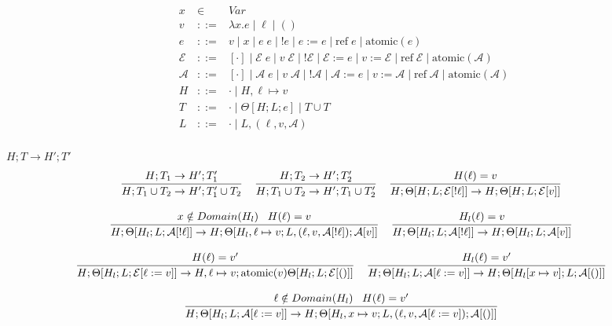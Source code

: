 \documentclass[9pt]{article}
\newcommand{\aeval}[1]{\mathcal{A}[#1]}
\newcommand{\actxt}[0]{\mathcal{A}}
\newcommand{\eval}[1]{\mathcal{E}[#1]}
\newcommand{\ctxt}[0]{\mathcal{E}}
\newcommand{\loc}[0]{\ell}
\newcommand{\atomic}[1]{\text{atomic}(#1)}
\newcommand{\alloc}[1]{\text{ref} \; #1}
\begin{document}
\begin{displaymath}
\begin{array}{rcll}
x &\in& Var \\
v &::=& \lambda x. e \; | \; \loc \; | \; () \\
e &::=& v \; | \; x \; | \; e \; e \; | \; !e \; | \; e := e \; | \; \alloc{e} \; | \; \atomic{e}\\
\ctxt &::=& [\cdot] \; | \; \ctxt \; e \; | \; v \; \ctxt \; | \; ! \ctxt \; | \; \ctxt := e \; | \; v := \ctxt \; | \; \alloc{\ctxt} \; | \; \atomic{\actxt}\\
\actxt &::=& [\cdot] \; | \; \actxt \; e \; | \; v \; \actxt \; | \; ! \actxt \; | \; \actxt := e \; | \; v := \actxt \; | \; \alloc{\actxt} \; | \; \atomic{\actxt} \\
H &::=& \cdot \; | \; H, \loc \mapsto v \\
T &::=& \cdot \; | \; \Theta[H; L; e] \; | \; T \cup T \\
L &::=& \cdot \; | \; L, (\loc, v, \actxt) \\
\end{array}
\end{displaymath}


$\boxed{H; T \rightarrow H' ;T'}$
\[
\infer[]{H; T_1 \cup T_2 \rightarrow H'; T_1' \cup T_2}{H; T_1 \rightarrow H'; T_1'} \;\;\;
\infer[]{H; T_1 \cup T_2 \rightarrow H'; T_1 \cup T_2'}{H; T_2 \rightarrow H'; T_2'} \;\;\; 
\infer[]{H; \Theta[H; L; \eval{!\loc}] \rightarrow H; \Theta[H; L; \eval{v}]}{H(\loc) = v}
\]

\[
\infer[]{H; \Theta[H_l; L; \aeval{!\loc}] \rightarrow H; \Theta[H_l, \loc \mapsto v; L, (\loc, v, \aeval{!\loc}); \aeval{v}]}{x \notin Domain(H_l) \;\;\; H(\loc) = v } \;\;\;
\infer[]{H; \Theta[H_l; L; \aeval{!\loc}] \rightarrow H; \Theta[H_l; L; \aeval{v}]}{H_l(\loc) = v }
\]

\[
\infer[]{H; \Theta[H_l; L; \eval{\loc := v}] \rightarrow H, \loc \mapsto v; \atomic{v}\Theta[H_l; L; \eval{()}]}{H(\loc) = v'} \;\;\;
\infer[]{H; \Theta[H_l; L; \aeval{\loc := v}] \rightarrow H; \Theta[H_l[x\mapsto v]; L; \aeval{()}]}{H_l(\loc) = v'}
\]

\[
\infer[]{H; \Theta[H_l; L; \aeval{\loc := v}] \rightarrow H; \Theta[H_l, x\mapsto v; L, (\loc, v, \aeval{\loc := v}); \aeval{()}]}{\loc \notin Domain(H_l) \;\;\; H(\loc) = v'}
\]
\end{document}
